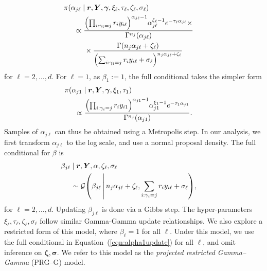 \begin{equation}
    \label{eqn:alphalupdate}
    \begin{aligned}
    &\hspace{-0.5cm}\pi(\alpha_{j\ell}\mid \bm{r},\bm{Y},\bm{\gamma},\xi_\ell,\tau_\ell,\zeta_\ell,\sigma_\ell) \\
    &\propto \frac{\left(\prod_{i:\gamma_i = j}r_iy_{i\ell}\right)^{\alpha_{j\ell} - 1}\alpha_{j\ell}^{\xi_\ell - 1}e^{-\tau_\ell \alpha_{j\ell}}\times}{\Gamma^{n_j}(\alpha_{j\ell})} \\
    &\hspace{0.5cm}\times \frac{\Gamma\left(n_j\alpha_{j\ell} + \zeta_{\ell}\right)}{\left(\sum_{i:\gamma_i = j}r_iy_{i\ell} + \sigma_{\ell}\right)^{n_j\alpha_{j\ell} + \zeta_{\ell}}}
    \end{aligned}
\end{equation}
for $\ell = 2,\ldots,d$.  For $\ell = 1$, as $\beta_{1} := 1$, the full conditional takes the simpler form
\begin{equation}
    \label{eqn:alpha1update}
    \begin{aligned}
    &\hspace{-0.5cm}\pi(\alpha_{j1}\mid\bm{r},\bm{Y},\bm{\gamma},\xi_1,\tau_1) \\
    &\propto \frac{\left(\prod_{i:\gamma_i = j}r_iy_{i1}\right)^{\alpha_{j1} - 1}\alpha_{j1}^{\xi_1 - 1}e^{-\tau_1\alpha_{j1}}}{\Gamma^{n_j}(\alpha_{j1})}.
    \end{aligned}
\end{equation}
Samples of $\alpha_{j\ell}$ can thus be obtained using a Metropolis step. In our analysis, we first transform $\alpha_{j\ell}$ to the log scale, and use a normal proposal density.
The full conditional for $\beta$ is 
\begin{equation}
    \label{eqn:betafc}
    \begin{aligned}
    &\hspace{-0.5cm}\beta_{j\ell}\mid\bm{r},\bm{Y},\alpha,\zeta_{\ell},\sigma_{\ell} \\
    &\sim \mathcal{G}\left(\beta_{j\ell}\bigmid n_j\alpha_{j\ell} + \zeta_\ell, \sum_{i:\gamma_i = j}r_iy_{i\ell} + \sigma_{\ell}\right),
    \end{aligned}
\end{equation}
for $\ell = 2,\ldots, d$.  Updating $\beta_{j\ell}$ is done via a Gibbs step.  The hyper-parameters $\xi_{\ell},\tau_{\ell},\zeta_{\ell},\sigma_{\ell}$ follow similar Gamma-Gamma update relationships.  We also explore a restricted form of this model, where $\beta_{\ell} = 1$ for all $\ell$.  Under this model, we use the full conditional in Equation~(\ref{eqn:alpha1update}) for all $\ell$, and omit inference on $\bm{\zeta},\bm{\sigma}$.  We refer to this model as the \emph{projected restricted Gamma--Gamma} (PRG--G) model.

